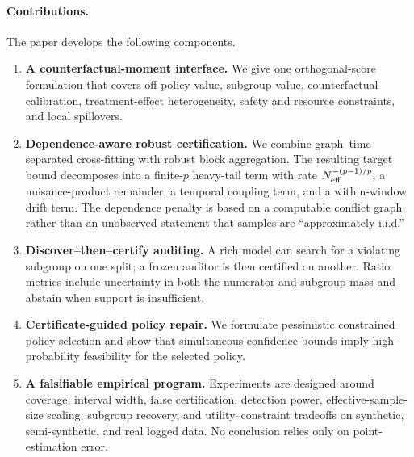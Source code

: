 \paragraph{Contributions.}
The paper develops the following components.
\begin{enumerate}[leftmargin=1.4em,itemsep=1pt,topsep=2pt]
    \item \textbf{A counterfactual-moment interface.} We give one orthogonal-score formulation that covers off-policy value, subgroup value, counterfactual calibration, treatment-effect heterogeneity, safety and resource constraints, and local spillovers.
    \item \textbf{Dependence-aware robust certification.} We combine graph--time separated cross-fitting with robust block aggregation. The resulting target bound decomposes into a finite-$p$ heavy-tail term with rate $N_{\mathrm{eff}}^{-(p-1)/p}$, a nuisance-product remainder, a temporal coupling term, and a within-window drift term. The dependence penalty is based on a computable conflict graph rather than an unobserved statement that samples are ``approximately i.i.d.''
    \item \textbf{Discover--then--certify auditing.} A rich model can search for a violating subgroup on one split; a frozen auditor is then certified on another. Ratio metrics include uncertainty in both the numerator and subgroup mass and abstain when support is insufficient.
    \item \textbf{Certificate-guided policy repair.} We formulate pessimistic constrained policy selection and show that simultaneous confidence bounds imply high-probability feasibility for the selected policy.
    \item \textbf{A falsifiable empirical program.} Experiments are designed around coverage, interval width, false certification, detection power, effective-sample-size scaling, subgroup recovery, and utility--constraint tradeoffs on synthetic, semi-synthetic, and real logged data. No conclusion relies only on point-estimation error.
\end{enumerate}

